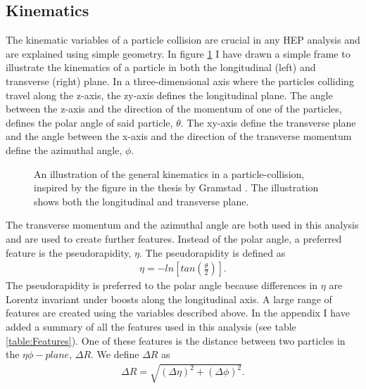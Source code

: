 \subsection{Kinematics}
The kinematic variables of a particle collision are crucial in any \ac{HEP} analysis and are explained using simple 
geometry. In figure \ref{fig:Kinematics} I have drawn a simple frame to illustrate the kinematics of a particle in both the 
longitudinal (left) and transverse (right) plane. In a three-dimensional axis where the particles colliding travel along the 
z-axis, the zy-axis defines the longitudinal plane.  The angle between the z-axis and the direction of the momentum of
one of the particles, defines the polar angle of said particle, $\theta$. The xy-axis define the transverse plane and the 
angle between the x-axis and the direction of the transverse momentum define the azimuthal angle, $\phi$.
\begin{figure}
    \centering
    \caption[An illustration of the general kinematics in a particle-collision.]{An illustration of the general kinematics in a particle-collision, 
    inspired by the figure in the thesis by Gramstad \cite{gramstad_searches_nodate}. The illustration shows both the 
    longitudinal and transverse plane. }
    \label{fig:Kinematics}
\end{figure}
The transverse momentum and the azimuthal angle are both used in this analysis and are used to create further features. 
Instead of the polar angle, a preferred feature is the pseudorapidity, $\eta$. The pseudorapidity is defined as 
\begin{align}\label{eq:eta}
    \eta = -ln\left[tan\left(\frac{\theta}{2}\right)\right].
\end{align}
The pseudorapidity is preferred to the polar angle because differences in $\eta$ are Lorentz invariant under boosts 
along the longitudinal axis. A large range of features are created using the variables described above. In the appendix I have 
added a summary of all the features used in this analysis (see table \ref{table:Features}). One of these features is the distance 
between two particles in the $\eta\phi-plane$, $\Delta R$. We define $\Delta R$ as 
\begin{align}
    \Delta R = \sqrt{(\Delta \eta)^2 + (\Delta \phi)^2}.
\end{align}

